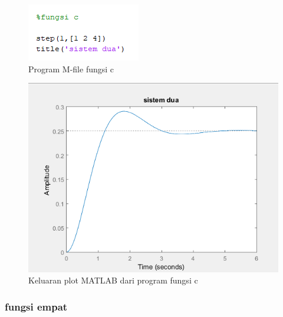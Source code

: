 \documentclass[12pt]{journal}
\begin{document}
\begin{figure}[H]
    \centering
    \includegraphics{7_c.png}
    \caption{Program M-file fungsi c}
    \label{soal_c}
\end{figure}
\begin{figure}[H]
    \centering
    \includegraphics[width=\textwidth]{hasil_7_c.png}
    \caption{Keluaran plot MATLAB dari program fungsi c}
    \label{hasil_c}
\end{figure}

\subsubsection{fungsi empat}
\end{document}
